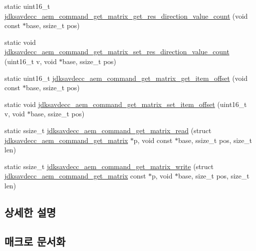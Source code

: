 \begin{DoxyCompactItemize}
\item 
static uint16\+\_\+t \hyperlink{group__command__get__matrix_ga5976272b432a59d63311e46bbea9f694}{jdksavdecc\+\_\+aem\+\_\+command\+\_\+get\+\_\+matrix\+\_\+get\+\_\+res\+\_\+direction\+\_\+value\+\_\+count} (void const $\ast$base, ssize\+\_\+t pos)
\item 
static void \hyperlink{group__command__get__matrix_ga9ef202e76bca7aa12fea00dc5b0bf777}{jdksavdecc\+\_\+aem\+\_\+command\+\_\+get\+\_\+matrix\+\_\+set\+\_\+res\+\_\+direction\+\_\+value\+\_\+count} (uint16\+\_\+t v, void $\ast$base, ssize\+\_\+t pos)
\item 
static uint16\+\_\+t \hyperlink{group__command__get__matrix_gadb6b13e98e77be3113e994f541690d21}{jdksavdecc\+\_\+aem\+\_\+command\+\_\+get\+\_\+matrix\+\_\+get\+\_\+item\+\_\+offset} (void const $\ast$base, ssize\+\_\+t pos)
\item 
static void \hyperlink{group__command__get__matrix_ga171cdde833ee2d14b7fdfa1d43d40fca}{jdksavdecc\+\_\+aem\+\_\+command\+\_\+get\+\_\+matrix\+\_\+set\+\_\+item\+\_\+offset} (uint16\+\_\+t v, void $\ast$base, ssize\+\_\+t pos)
\item 
static ssize\+\_\+t \hyperlink{group__command__get__matrix_ga36f08975d519b9c9763b9446fd47d7df}{jdksavdecc\+\_\+aem\+\_\+command\+\_\+get\+\_\+matrix\+\_\+read} (struct \hyperlink{structjdksavdecc__aem__command__get__matrix}{jdksavdecc\+\_\+aem\+\_\+command\+\_\+get\+\_\+matrix} $\ast$p, void const $\ast$base, ssize\+\_\+t pos, size\+\_\+t len)
\item 
static ssize\+\_\+t \hyperlink{group__command__get__matrix_ga1fd4f698ee7ce020a126335e252e47d3}{jdksavdecc\+\_\+aem\+\_\+command\+\_\+get\+\_\+matrix\+\_\+write} (struct \hyperlink{structjdksavdecc__aem__command__get__matrix}{jdksavdecc\+\_\+aem\+\_\+command\+\_\+get\+\_\+matrix} const $\ast$p, void $\ast$base, size\+\_\+t pos, size\+\_\+t len)
\end{DoxyCompactItemize}


\subsection{상세한 설명}


\subsection{매크로 문서화}

